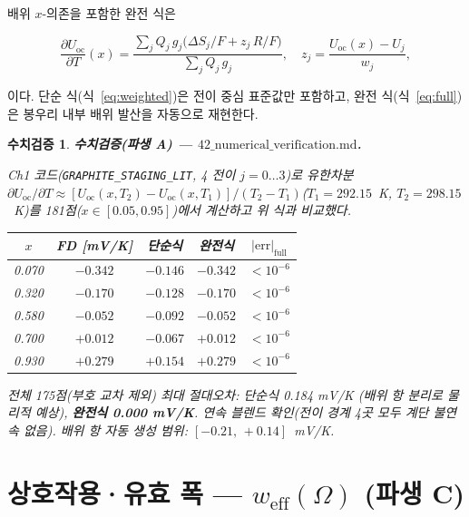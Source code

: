\documentclass[11pt,a4paper]{article}
\newtheorem*{verifybox}{수치검증}
\newcommand{\oc}{\mathrm{oc}}
\newcommand{\eff}{\mathrm{eff}}
\begin{document}
배위 $x$-의존을 포함한 완전 식은

\begin{equation}
  \frac{\partial U_\oc}{\partial T}(x)
  = \frac{\sum_j Q_j\,g_j\bigl(\Delta S_j/F + z_j\,R/F\bigr)}{\sum_j Q_j\,g_j},
  \quad z_j = \frac{U_\oc(x) - U_j}{w_j},
  \label{eq:full}
\end{equation}

이다. 단순 식(식~\eqref{eq:weighted})은 전이 중심 표준값만 포함하고,
완전 식(식~\eqref{eq:full})은 봉우리 내부 배위 발산을 자동으로 재현한다.

\begin{verifybox}
\textbf{수치검증(파생 A) — $42\_\mathrm{numerical\_verification.md}$.}

Ch1 코드(\texttt{GRAPHITE\_STAGING\_LIT}, 4 전이 $j=0\ldots3$)로 유한차분
$\partial U_\oc/\partial T \approx [U_\oc(x,T_2)-U_\oc(x,T_1)]/(T_2-T_1)$($T_1=292.15$~K,
$T_2=298.15$~K)를 181점($x\in[0.05,0.95]$)에서 계산하고 위 식과 비교했다.

\medskip
\begin{center}
\small
\renewcommand{\arraystretch}{1.15}
\begin{tabular}{ccccc}
\toprule
$x$ & FD [mV/K] & 단순식 & 완전식 & $|\mathrm{err}|_\mathrm{full}$ \\
\midrule
0.070 & $-0.342$ & $-0.146$ & $-0.342$ & $<10^{-6}$ \\
0.320 & $-0.170$ & $-0.128$ & $-0.170$ & $<10^{-6}$ \\
0.580 & $-0.052$ & $-0.092$ & $-0.052$ & $<10^{-6}$ \\
0.700 & $+0.012$ & $-0.067$ & $+0.012$ & $<10^{-6}$ \\
0.930 & $+0.279$ & $+0.154$ & $+0.279$ & $<10^{-6}$ \\
\bottomrule
\end{tabular}
\end{center}
\medskip

전체 175점(부호 교차 제외) 최대 절대오차:
단순식 0.184 mV/K (배위 항 분리로 물리적 예상), \textbf{완전식 0.000 mV/K}.
연속 블렌드 확인(전이 경계 4곳 모두 계단 불연속 없음).
배위 항 자동 생성 범위: $[-0.21,\,+0.14]$~mV/K.
\end{verifybox}

\section{상호작용·유효 폭 — $w_\eff(\Omega)$ (파생 C)}\label{sec:weff}
\end{document}
